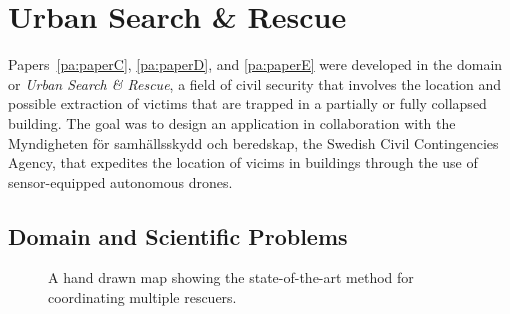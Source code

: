 





\section{Urban Search \& Rescue} \label{contributions:usar}
Papers~\ref{pa:paperC}, \ref{pa:paperD}, and \ref{pa:paperE} were developed in the domain or \emph{Urban Search \& Rescue}, a field of civil security that involves the location and possible extraction of victims that are trapped in a partially or fully collapsed building.  The goal was to design an application in collaboration with the Myndigheten f\"or samh\"allsskydd och beredskap, the Swedish Civil Contingencies Agency, that expedites the location of vicims in buildings through the use of sensor-equipped autonomous drones.



\subsection{Domain and Scientific Problems} \label{contributions:usar:background}
\begin{figure}
\centering
{}
\caption{A hand drawn map showing the state-of-the-art method for coordinating multiple rescuers.}
\label{contributions:usar:map:hand}
\end{figure}

